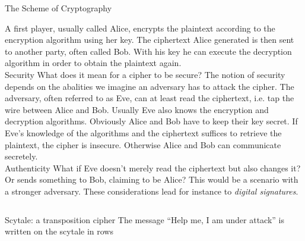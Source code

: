 \documentclass[final,hyperref={pdfpagelabels=false}]{beamer}
\begin{document}
\begin{frame}{}
\begin{columns}[t]
\begin{column}{.48\linewidth}
\begin{block}{\large The Scheme of Cryptography}
\begin{figure}
    \end{figure}
    A first player, usually called Alice, encrypts the plaintext according to the encryption algorithm using her key. The ciphertext Alice generated is then sent to another party, often called Bob. With his key he can execute the decryption algorithm in order to obtain the plaintext again. \\
    \alert{Security} 
      What does it mean for a cipher to be secure? The notion of security depends on the abalities we imagine an adversary has to attack the cipher. The adversary, often referred to as Eve, can at least read the ciphertext, i.e. tap the wire between Alice and Bob. Usually Eve also knows the encryption and decryption algorithms. Obviously Alice and Bob have to keep their key secret. If Eve's knowledge of the algorithms and the ciphertext suffices to retrieve the plaintext, the cipher is insecure. Otherwise Alice and Bob can communicate secretely. \\
    \alert{Authenticity} 
      What if Eve doesn't merely read the ciphertext but also changes it? Or sends something to Bob, claiming to be Alice? This would be a scenario with a stronger adversary. These considerations lead for instance to {\em digital signatures}.
    \end{block}
      \begin{block}{\large }
      \end{block}
    \end{column}
    \end{columns}
    \vfill
    \vfill
    \begin{block}{\large }
    \end{block}
    \vfill
    \begin{columns}[t]
      \begin{column}{.48\linewidth}
        \begin{block}{Scytale: a transposition cipher}
        The message ``Help me, I am under attack'' is written on the scytale in rows
        \begin{equation*}
        \begin{array}{|c|c|c|c|c|}
              &    &    &    &   \\

\end{array}
\end{equation*}
\end{block}
\end{column}
\end{columns}
\end{frame}
\end{document}
